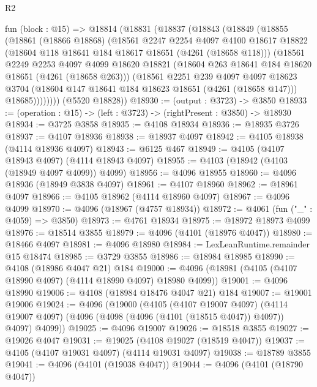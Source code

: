 \begin{lexlean}{R2}
\begin{coremodule}
  fun (block : @15) =>
  @18814
    (@18831
      (@18837
        (@18843
          (@18849
            (@18855
              (@18861
                (@18866 @18868)
                (@18561
                  @2247
                  @2254
                  @4097
                  @4100
                  @18617
                  @18822
                  (@18604 @118 @18641 @184 @18617 @18651 (@4261 (@18658 @118)))
                  (@18561
                    @2249
                    @2253
                    @4097
                    @4099
                    @18620
                    @18821
                    (@18604 @263 @18641 @184 @18620 @18651 (@4261 (@18658 @263)))
                    (@18561
                      @2251
                      @239
                      @4097
                      @4097
                      @18623
                      @3704
                      (@18604 @147 @18641 @184 @18623 @18651 (@4261 (@18658 @147)))
                      @18685))))))))
      (@5520 @18828))
@18930 := (output : @3723) -> @3850
@18933 := (operation : @15) -> (left : @3723) -> (rightPresent : @3850) -> @18930
@18934 := @3725 @3858
@18935 := @4108 @18934
@18936 := @18935 @3726
@18937 := @4107 @18936
@18938 := @18937 @4097
@18942 := @4105 @18938 (@4114 @18936 @4097)
@18943 := @6125 @467
@18949 := @4105 (@4107 @18943 @4097) (@4114 @18943 @4097)
@18955 := @4103 (@18942 (@4103 (@18949 @4097 @4099)) @4099)
@18956 := @4096 @18955
@18960 := @4096 @18936 (@18949 @3838 @4097)
@18961 := @4107 @18960
@18962 := @18961 @4097
@18966 := @4105 @18962 (@4114 @18960 @4097)
@18967 := @4096 @4099
@18970 := @4096 (@18967 (@4757 @18934))
@18972 := @4061 (fun ("_" : @4059) => @3850)
@18973 := @4761 @18934
@18975 := @18972 @18973 @4099
@18976 := @18514 @3855
@18979 := @4096 (@4101 (@18976 @4047))
@18980 := @18466 @4097
@18981 := @4096 @18980
@18984 := LexLeanRuntime.remainder @15 @18474
@18985 := @3729 @3855
@18986 := @18984 @18985
@18990 := @4108 (@18986 @4047 @21) @184
@19000 := @4096 (@18981 (@4105 (@4107 @18990 @4097) (@4114 @18990 @4097) @18980 @4099))
@19001 := @4096 @18990
@19006 := @4108 (@18984 @18476 @4047 @21) @184
@19007 := @19001 @19006
@19024 := @4096
    (@19000
      (@4105
        (@4107 @19007 @4097)
        (@4114 @19007 @4097)
        (@4096 (@4098 (@4096 (@4101 (@18515 @4047)) @4097)) @4097)
        @4099))
@19025 := @4096 @19007
@19026 := @18518 @3855
@19027 := @19026 @4047
@19031 := @19025 (@4108 @19027 (@18519 @4047))
@19037 := @4105 (@4107 @19031 @4097) (@4114 @19031 @4097)
@19038 := @18789 @3855
@19041 := @4096 (@4101 (@19038 @4047))
@19044 := @4096 (@4101 (@18790 @4047))

\end{coremodule}
\end{lexlean}
